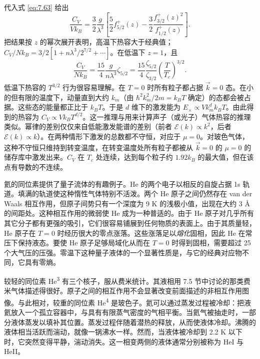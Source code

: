代入式 \eqref{eq:7.63} 给出
\begin{equation}\label{eq:7.65}
\frac{C_V}{Vk_B}=\frac32\frac g{\lambda^3}\left[\frac52f_{5/2}^+(z)-\frac32\frac{f_{3/2}^+(z)^2}{f_{1/2}^+(z)}\right].
\end{equation}
把结果按 $z$ 的幂次展开表明，高温下热容大于经典值；$C_V/Nk_B=3/2[1+n\lambda^3/2^{7/2}+\cdots]$。在低温下 $z=1$，且
\begin{equation}\label{eq:7.66}
\frac{C_V}{Nk_B}=\frac{15}4\frac g{n\lambda^3}\zeta_{5/2}=\frac{15}4\frac{\zeta_{5/2}}{\zeta_{3/2}}\left(\frac T{T_c}\right)^{3/2}.
\end{equation}
低温下热容的 $T^{3/2}$ 行为很容易理解。在 $T=0$ 时所有粒子都占据 $\vec k=0$ 态。在小的但有限的温度下，动量直到大约 $k_m$（由 $\hbar^2k_m^2/2m=k_BT$ 确定）的态都会被占据。这些态的能量都正比于 $k_BT$。于是 $d$ 维下的激发能为 $E_\times\propto Vk_m^dk_BT$。由此得到的热容为 $C_V\propto Vk_BT^{d/2}$。这一推理与用来计算声子（或光子）气体热容的推理类似。幂律的差别仅仅来自低能激发能谱的差别（前者 $\mathcal E(k)\propto k^2$，后者 $\mathcal E(k)\propto k$）。在两种情形下激发的总数都不守恒，对应于 $\mu=0$。对玻色气体，这种不守恒只维持到转变温度，在转变温度处所有粒子都被从 $\vec k=0$ 的 $\mu=0$ 的储存库中激发出来。$C_V$ 在 $T_c$ 处连续，达到每个粒子约 $1.92k_B$ 的最大值，但在该点有导数的不连续。


氦的同位素提供了量子流体的有趣例子。He 的两个电子以相反的自旋占据 1s 轨道。填满的轨道使这种惰性气体特别不活泼。两个 He 原子之间仍然存在 van der Waals 相互作用，但原子间势只有一个深度为 9 K 的浅极小值，出现在大约 3 \AA{} 的间距处。这种相互作用的微弱使 He 成为一种普适的。由于 He 原子对几乎所有其它分子都有更强的吸引，它们很容易铺展到任何物质的表面上。由于其质量轻，He 原子在 $T=0$ 时经历很大的零点涨落。这些涨落足以\emph{熔化}固相，因此 He 在常压下保持液态。要使 He 原子足够局域化从而在 $T=0$ 时得到固相，需要超过 25 个大气压的压强。零温下这种量子液体的一个显著性质是，与它的经典对应物不同，它具有零熵。



较轻的同位素 He\textsuperscript{3} 有三个核子，服从费米统计。其液相用 7.5 节中讨论的那类费米气体描述得很好。原子之间的相互作用不会显著改变前面描述的非相互作用图像。与此相对，较重的同位素 He\textsuperscript{4} 是玻色子。氦可以通过蒸发过程被冷却：把液氦放入一个孤立容器中，与具有有限蒸气密度的气相平衡。当氦气被抽走时，一部分液体蒸发以填补其位置。蒸发过程伴随着潜热的释放，从而使液体冷却。沸腾的液体相当活跃而湍动，就像一锅沸水一样。然而，当液体被冷却到 2.2 K 以下时，它突然变得平静，湍动消失。这一相变两侧的液体通常分别被称为 HeI 与 HeII。

